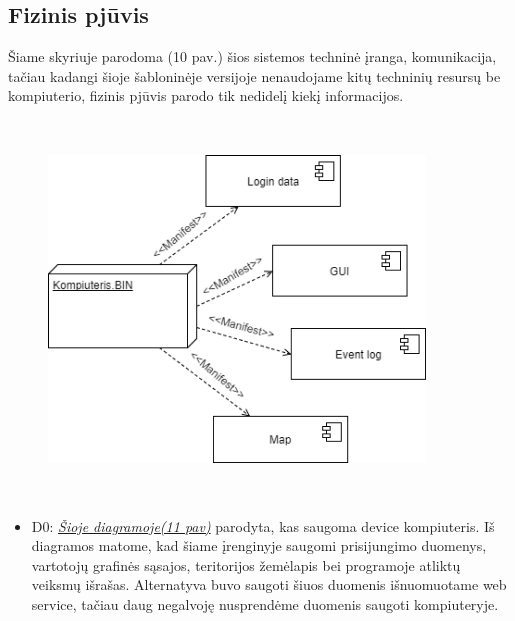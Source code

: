 \documentclass[oneside]{VUMIFPSkursinis}
\begin{document}
\subsection{Fizinis pjūvis}
	Šiame skyriuje parodoma (10 pav.) šios sistemos techninė įranga, komunikacija, tačiau kadangi šioje šabloninėje versijoje nenaudojame kitų techninių resursų be kompiuterio, fizinis pjūvis parodo tik nedidelį kiekį informacijos.
	\newline
	\vskip 0.5cm
	\begin{figure}[H]
	\centering	
	\includegraphics[width=10cm,height=10cm,keepaspectratio]{Deployment.png}
	\caption{}
	\label{fig:Deployment}
\end{figure}
	\begin{itemize}
		\item D0: \hyperref[fig:Deployment]{\textit{Šioje diagramoje(11 pav)}} parodyta, kas saugoma device kompiuteris. 
		Iš diagramos matome, kad šiame įrenginyje saugomi prisijungimo duomenys, vartotojų grafinės sąsajos, teritorijos žemėlapis bei programoje atliktų veiksmų išrašas. Alternatyva buvo saugoti šiuos duomenis išnuomuotame web service, tačiau daug negalvoję nusprendėme duomenis saugoti kompiuteryje.
	\end{itemize}
\end{document}
